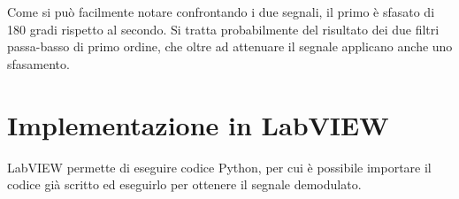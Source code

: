 \documentclass{article}
\begin{document}
Come si può facilmente notare confrontando i due segnali, il primo è sfasato di 180 gradi rispetto al secondo.
Si tratta probabilmente del risultato dei due filtri passa-basso di primo ordine, che oltre ad attenuare il segnale
applicano anche uno sfasamento.

\section{Implementazione in LabVIEW}
LabVIEW permette di eseguire codice Python, per cui è possibile importare il codice già scritto ed eseguirlo per ottenere
il segnale demodulato.
\end{document}
